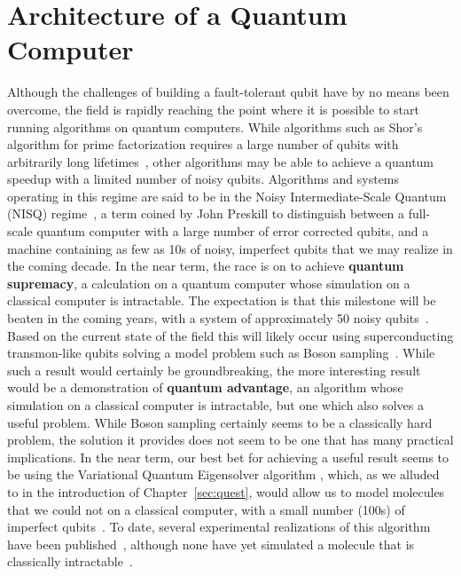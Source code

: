 \chapter{Architecture of a Quantum Computer}
\label{sec:arch}
Although the challenges of building a fault-tolerant qubit have by no means been overcome, the field is rapidly reaching the point where
it is possible to start running algorithms on quantum computers. While algorithms such as Shor's algorithm for prime factorization
requires a large number of qubits with arbitrarily long lifetimes~\cite{Beauregard:2003,6657074}, other algorithms may
be able to achieve a quantum speedup with a limited number of noisy qubits. Algorithms and systems operating in this regime are
said to be in the Noisy Intermediate-Scale Quantum (NISQ) regime~\cite{Preskill2018quantumcomputingin}, a term coined by John Preskill
to distinguish between a full-scale quantum computer with a large number of error corrected qubits, and a machine containing as few
as 10s of noisy, imperfect qubits that we may realize in the coming decade. In the near term, the race is on to achieve \textbf{quantum supremacy},
a calculation on a quantum computer whose simulation on a classical computer is intractable. The expectation is that this milestone will
be beaten in the coming years, with a system of approximately 50 noisy qubits~\cite{s41567-018-0124-x}. Based on the current state of the field
this will likely occur using superconducting transmon-like qubits solving a model problem such as Boson sampling~\cite{Aaronson:2011}. While such a
result would certainly be groundbreaking, the more interesting result would be a demonstration of \textbf{quantum advantage}, an algorithm whose simulation on a
classical computer is intractable, but one which also solves a useful problem. While Boson sampling certainly seems to be a classically hard problem,
the solution it provides does not seem to be one that has many practical implications. In the near term, our best bet for achieving a useful result
seems to be using the Variational Quantum Eigensolver algorithm \cite{ncomms5213}, which, as we alluded to in the introduction of Chapter~\ref{sec:quest}, would allow us
to model molecules that we could not on a classical computer, with a small number (100s) of imperfect qubits~\cite{PhysRevA.92.042303}.
To date, several experimental realizations of this algorithm have been published~\cite{nature23879,PhysRevX.8.011021,10.1038/s41586-019-1040-7},
although none have yet simulated a molecule that is classically intractable~\cite{Reiher7555}.

